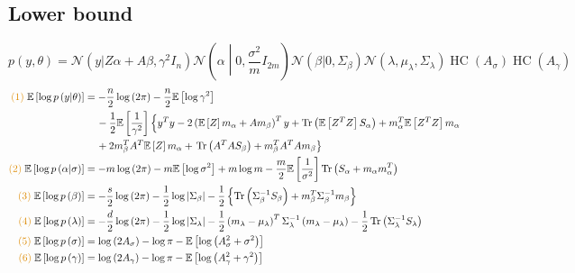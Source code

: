 \documentclass[11pt]{article}
\DeclareMathOperator{\Tr}{Tr}
\newcommand{\opn}{\operatorname}
\begin{document}
\subsection{Lower bound}
$$
  p\left(y, \theta \right) = \mathcal{N}\left(y|Z\alpha + A\beta, \gamma^{2}I_{n}\right) \mathcal{N}\left(\alpha \middle|0, \frac{\sigma^{2}}{m}I_{2m}\right)\mathcal{N}\left(\beta|0,\Sigma_{\beta}\right)\mathcal{N}\left(\lambda,\mu_{\lambda},\Sigma_{\lambda}\right)\operatorname{HC}\left(A_{\sigma}\right)\opn{HC}\left(A_{\gamma}\right)
$$
\begin{align*}
  \textcolor{myorange}{(1)}\;\mathbb{E}\left[\log p\left(y|\theta \right)\right] &= -\frac{n}{2}\log \left(2\pi \right) - \frac{n}{2}\mathbb{E}\left[\log \gamma^{2}\right] \\
  & \,\quad - \frac{1}{2}\mathbb{E}\left[\frac{1}{\gamma^{2}}\right] \left\{y^{T}y -2 \left(\mathbb{E}\left[Z\right]m_{\alpha}+Am_{\beta} \right)^{T}y + \Tr\left(\mathbb{E}\left[Z^{T}Z\right]S_{\alpha} \right) +m_{\alpha}^{T}\mathbb{E}\left[Z^{T}Z\right]m_{\alpha}\right. \\
  &\quad\, + 2m_{\beta}^{T}A^{T}\mathbb{E}\left[Z\right]m_{\alpha} + \left. \Tr\left(A^{T}A S_{\beta}\right) + m_{\beta}^{T}A^{T}A m_{\beta} \right\}\\
  \textcolor{myorange}{(2)}\;\mathbb{E}\left[\log p \left(\alpha|\sigma\right)\right] &= -m \log \left(2\pi \right) -m \mathbb{E}\left[\log \sigma^{2}\right] +m\log m -\frac{m}{2}\mathbb{E}\left[\frac{1}{\sigma^{2}}\right]\Tr \left(S_{\alpha} +m_{\alpha}m_{\alpha}^{T}\right)\\
  \textcolor{myorange}{(3)}\;\mathbb{E}\left[\log p\left(\beta\right)\right] &= -\frac{s}{2}\log \left(2\pi \right) -\frac{1}{2}\log \left|\Sigma_{\beta}\right| -\frac{1}{2}\left\{\Tr \left(\Sigma_{\beta}^{-1}S_{\beta}\right) +m_{\beta}^{T}\Sigma_{\beta}^{-1}m_{\beta} \right\}\\
  \textcolor{myorange}{(4)}\;\mathbb{E}\left[\log p\left(\lambda\right)\right] &= -\frac{d}{2}\log  \left(2\pi \right) -\frac{1}{2}\log \left|\Sigma_{\lambda}\right| -\frac{1}{2}\left(m_{\lambda}-\mu_{\lambda}\right)^{T}\Sigma_{\lambda}^{-1}\left(m_{\lambda}-\mu_{\lambda}\right) - \frac{1}{2}\Tr\left(\Sigma_{\lambda}^{-1}S_{\lambda}\right) \\
  \textcolor{myorange}{(5)}\;\mathbb{E}\left[\log p\left(\sigma\right)\right] &= \log \left(2A_{\sigma}\right) -\log \pi -\mathbb{E}\left[\log \left(A_{\sigma}^{2}+\sigma^{2}\right)\right]\\
  \textcolor{myorange}{(6)}\;\mathbb{E}\left[\log p \left(\gamma\right)\right] &= \log \left(2A_{\gamma}\right) -\log \pi -\mathbb{E}\left[\log \left(A_{\gamma}^{2}+\gamma^{2}\right)\right] \\

\end{align*}
\end{document}

